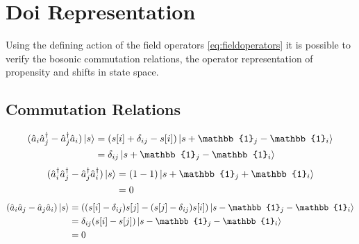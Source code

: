 \documentclass{article}[12pt]
\numberwithin{equation}{section}
\begin{document}
\section{Doi Representation}\label{a:doi}
Using the defining action of the field operators \eqref{eq:fieldoperators} it is
possible to verify the bosonic commutation relations, the operator
representation of propensity and shifts in state space.
\subsection{Commutation Relations}
\begin{align*}
		(\hat{a}_i \hat{a}_j^{\dagger}-\hat{a}_j^{\dagger}\hat{a}_i)
		\ket{s}&=(s[i]+\delta_{ij}-s[i])\ket{s+\mathbb{1}_j-\mathbb{1}_i}\\
		&=\delta_{ij}\ket{s+\mathbb{1}_j-\mathbb{1}_i}
\end{align*}
\vspace{-30pt}
\begin{align*}
		(\hat{a}_i^{\dagger}\hat{a}_j^{\dagger}-\hat{a}_j^{\dagger}\hat{a}_i^{\dagger})
		\ket{s}&=(1-1)\ket{s+\mathbb{1}_j+\mathbb{1}_i}
	\\ &=0
\end{align*}
\vspace{-30pt}
\begin{align*}
		(\hat{a}_i\hat{a}_j-\hat{a}_j\hat{a}_i)
		\ket{s}&=((s[i]-\delta_{ij})s[j]-(s[j]-\delta_{ij})s[i])\ket{s-\mathbb{1}_j-\mathbb{1}_i}
		\\
		&=\delta_{ij}(s[i]-s[j])\ket{s-\mathbb{1}_j-\mathbb{1}_i}\\
		&=0
\end{align*}
\end{document}
